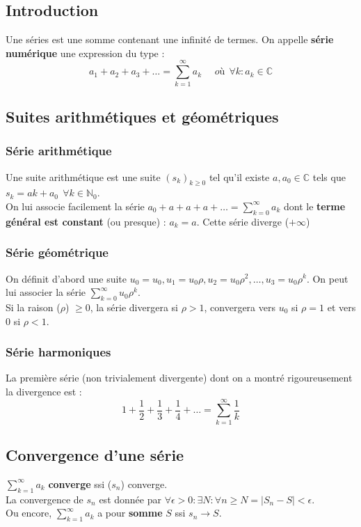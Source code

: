 \documentclass	[11pt, a4paper, openany]{book}
\begin{document}
\subsection{Introduction}
Une séries est une somme contenant une infinité de termes. On appelle \textbf{série numérique} une expression du type :
\begin{equation}
a_1 + a_2 + a_3 + \dots = \sum_{k=1}^\infty a_k\ \ \ \ \ \ où\ \ \forall k : a_k \in \mathbb{C}
\end{equation}

\subsection{Suites arithmétiques et géométriques}
\subsubsection{Série arithmétique}
Une suite arithmétique est une suite $(s_k)_{k \geq 0}$ tel qu'il existe $a, a_0 \in \mathbb{C}$ tels que $s_k = ak + a_0\ \ \forall k \in \mathbb{N}_0$.\\
On lui associe facilement la série $a_0 + a + a + a + \dots = \sum_{k=0}^\infty a_k$ dont  le \textbf{terme général est constant} (ou presque) : $a_k = a$.
Cette série diverge ($+\infty$)

\subsubsection{Série géométrique}
On définit d'abord une suite $u_0 = u_0, u_1 = u_0\rho, u_2 = u_0\rho^2,\dots, u_3 = u_0\rho^k$. On peut lui associer la série $\sum_{k=0}^\infty u_0\rho^k$.\\
Si la raison ($\rho$) $\geq 0$, la série divergera si $\rho > 1$, convergera vers $u_0$ si $\rho = 1$ et vers $0$ si $\rho < 1$.

\subsubsection{Série harmoniques}
La première série (non trivialement divergente) dont on a montré rigoureusement la divergence est :
\begin{equation}
1 + \frac{1}{2} + \frac{1}{3} + \frac{1}{4} + \dots = \sum_{k=1}^\infty \frac{1}{k}
\end{equation}

\setcounter{subsection}{3}
\subsection{Convergence d'une série}
$\sum_{k=1}^\infty a_k$ \textbf{converge} ssi ($s_n$) converge.\\
La convergence de $s_n$ est donnée par $\forall \epsilon > 0 : \exists N : \forall n \geq N = |S_n - S| < \epsilon$.\\
Ou encore, $\sum_{k=1}^\infty a_k$ a pour \textbf{somme} $S$ ssi $s_n \rightarrow S$.
\end{document}
